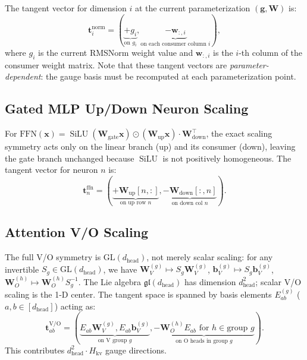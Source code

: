 \documentclass{article}
\newcommand{\bx}{\mathbf{x}}
\newcommand{\bW}{\mathbf{W}}
\DeclareMathOperator{\SiLU}{SiLU}
\begin{document}
The tangent vector for dimension $i$ at the current parameterization $(\mathbf{g}, \bW)$ is:
\begin{equation}
    \mathbf{t}_i^{\text{norm}} = (\underbrace{+g_i}_{\text{on } g_i}, \underbrace{-\mathbf{w}_{:,i}}_{\text{on each consumer column } i}),
\end{equation}
where $g_i$ is the current RMSNorm weight value and $\mathbf{w}_{:,i}$ is the $i$-th column of the consumer weight matrix.  Note that these tangent vectors are \emph{parameter-dependent}: the gauge basis must be recomputed at each parameterization point.

\subsection{Gated MLP Up/Down Neuron Scaling}

For $\text{FFN}(\bx) = \SiLU(\bW_\text{gate}\bx) \odot (\bW_\text{up}\bx) \cdot \bW_\text{down}^\top$, the exact scaling symmetry acts only on the linear branch (up) and its consumer (down), leaving the gate branch unchanged because $\SiLU$ is not positively homogeneous.  The tangent vector for neuron $n$ is:
\begin{equation}
    \mathbf{t}_n^{\text{ffn}} = (\underbrace{+\bW_\text{up}[n,:]}_{\text{on up row } n}, \underbrace{-\bW_\text{down}[:,n]}_{\text{on down col } n}).
\end{equation}

\subsection{Attention V/O Scaling}

The full V/O symmetry is $\mathrm{GL}(d_\text{head})$, not merely scalar scaling: for any invertible $S_g \in \mathrm{GL}(d_\text{head})$, we have $\bW_V^{(g)} \mapsto S_g \bW_V^{(g)}$, $\mathbf{b}_V^{(g)} \mapsto S_g \mathbf{b}_V^{(g)}$, $\bW_O^{(h)} \mapsto \bW_O^{(h)} S_g^{-1}$.  The Lie algebra $\mathfrak{gl}(d_\text{head})$ has dimension $d_\text{head}^2$; scalar V/O scaling is the 1-D center.  The tangent space is spanned by basis elements $E_{ab}^{(g)}$ ($a,b \in [d_\text{head}]$) acting as:
\begin{equation}
    \mathbf{t}_{ab}^{\text{V/O}} = (\underbrace{E_{ab} \bW_V^{(g)}, E_{ab} \mathbf{b}_V^{(g)}}_{\text{on V group } g}, \underbrace{-\bW_O^{(h)} E_{ab} \text{ for } h \in \text{group } g}_{\text{on O heads in group } g}).
\end{equation}
This contributes $d_\text{head}^2 \cdot H_{\text{kv}}$ gauge directions.
\end{document}
